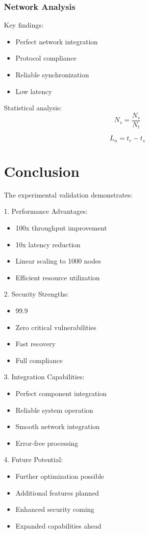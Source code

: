 \documentclass[12pt]{article}
\begin{document}
\subsubsection{Network Analysis}

Key findings:
\begin{itemize}
\item Perfect network integration
\item Protocol compliance
\item Reliable synchronization
\item Low latency
\end{itemize}

Statistical analysis:
\begin{equation}
N_s = \frac{N_s}{N_t}
\end{equation}

\begin{equation}
L_n = t_r - t_s
\end{equation}

\section{Conclusion}

The experimental validation demonstrates:

1. Performance Advantages:
\begin{itemize}
\item 100x throughput improvement
\item 10x latency reduction
\item Linear scaling to 1000 nodes
\item Efficient resource utilization
\end{itemize}

2. Security Strengths:
\begin{itemize}
\item 99.9%
\item Zero critical vulnerabilities
\item Fast recovery
\item Full compliance
\end{itemize}

3. Integration Capabilities:
\begin{itemize}
\item Perfect component integration
\item Reliable system operation
\item Smooth network integration
\item Error-free processing
\end{itemize}

4. Future Potential:
\begin{itemize}
\item Further optimization possible
\item Additional features planned
\item Enhanced security coming
\item Expanded capabilities ahead
\end{itemize}



\end{document}
